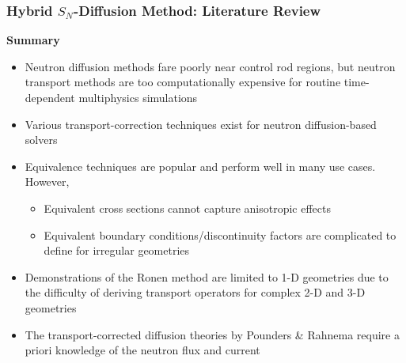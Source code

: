 \begin{frame}
  \frametitle{Hybrid $S_N$-Diffusion Method: Literature Review}
  \begin{block}{\textbf{Summary}}
    \begin{itemize}
      \item Neutron diffusion methods fare poorly near control rod regions, but neutron transport
        methods are too computationally expensive for routine time-dependent multiphysics simulations
      \item Various transport-correction techniques exist for neutron diffusion-based solvers
      \item Equivalence techniques are popular and perform well in many use cases. However,
        \begin{itemize}
          \item Equivalent cross sections cannot capture anisotropic effects
          \item Equivalent boundary conditions/discontinuity factors are complicated to define for
            irregular geometries
        \end{itemize}
      \item Demonstrations of the Ronen method are limited to 1-D geometries due to the difficulty of
        deriving transport operators for complex 2-D and 3-D geometries
      \item The transport-corrected diffusion theories by Pounders \& Rahnema require a priori
        knowledge of the neutron flux and current
    \end{itemize}
  \end{block}
\end{frame}
